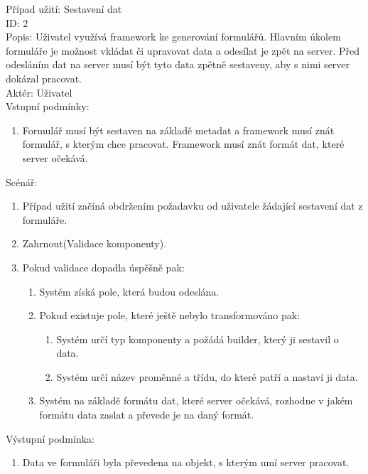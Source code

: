 Případ užití: Sestavení dat\\
ID: 2\\
Popis: 
Uživatel využívá framework ke generování formulářů. Hlavním úkolem formuláře je možnost vkládat či upravovat data a odesílat je zpět na server. Před odesláním dat na server musí být tyto data zpětně sestaveny, aby s nimi server dokázal pracovat.
\\
Aktér: Uživatel\\
Vstupní podmínky:
\begin{enumerate}
\item Formulář musí být sestaven na základě metadat a framework musí znát formulář, s kterým chce pracovat. Framework musí znát formát dat, které server očekává.
\end{enumerate}
Scénář:
\begin{enumerate}
\item Případ užití začíná obdržením požadavku od uživatele žádající sestavení dat z formuláře.
\item Zahrnout(Validace komponenty).
\item Pokud validace dopadla úspěšně pak:
\begin{enumerate}
\item Systém získá pole, která budou odeslána.
\item Pokud existuje pole, které ještě nebylo transformováno pak:
\begin{enumerate}
\item Systém určí typ komponenty a požádá builder, který ji sestavil o data.
\item Systém určí název proměnné a třídu, do které patří a nastaví ji data.
\end {enumerate}
\item Systém na základě formátu dat, které server očekává, rozhodne v jakém formátu data zaslat a převede je na daný formát.
\end{enumerate}
\end{enumerate}

Výstupní podmínka:
\begin{enumerate}
\item Data ve formuláři byla převedena na objekt, s kterým umí server pracovat.
\end{enumerate}

